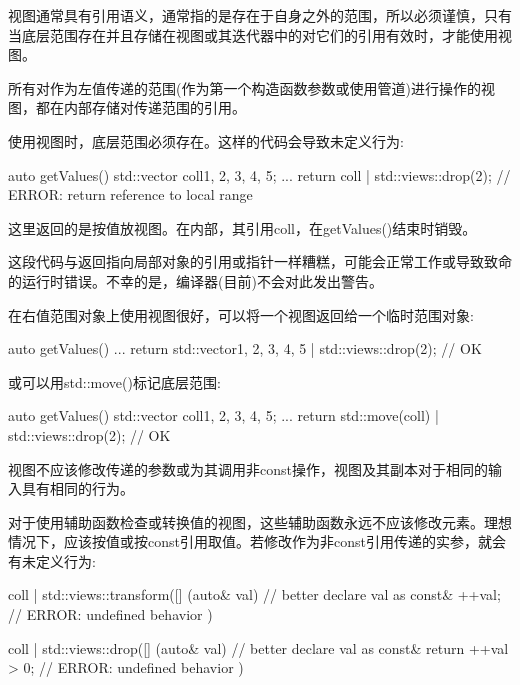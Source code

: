 
视图通常具有引用语义，通常指的是存在于自身之外的范围，所以必须谨慎，只有当底层范围存在并且存储在视图或其迭代器中的对它们的引用有效时，才能使用视图。


所有对作为左值传递的范围(作为第一个构造函数参数或使用管道)进行操作的视图，都在内部存储对传递范围的引用。

使用视图时，底层范围必须存在。这样的代码会导致未定义行为:

\begin{cpp}
auto getValues()
{
	std::vector coll{1, 2, 3, 4, 5};
	...
	return coll | std::views::drop(2); // ERROR: return reference to local range
}
\end{cpp}

这里返回的是按值放视图。在内部，其引用coll，在getValues()结束时销毁。

这段代码与返回指向局部对象的引用或指针一样糟糕，可能会正常工作或导致致命的运行时错误。不幸的是，编译器(目前)不会对此发出警告。

在右值范围对象上使用视图很好，可以将一个视图返回给一个临时范围对象:

\begin{cpp}
auto getValues()
{
	...
	return std::vector{1, 2, 3, 4, 5} | std::views::drop(2); // OK
}
\end{cpp}

或可以用std::move()标记底层范围:

\begin{cpp}
auto getValues()
{
	std::vector coll{1, 2, 3, 4, 5};
	...
	return std::move(coll) | std::views::drop(2); // OK
}
\end{cpp}


视图不应该修改传递的参数或为其调用非const操作，视图及其副本对于相同的输入具有相同的行为。

对于使用辅助函数检查或转换值的视图，这些辅助函数永远不应该修改元素。理想情况下，应该按值或按const引用取值。若修改作为非const引用传递的实参，就会有未定义行为:

\begin{cpp}
coll | std::views::transform([] (auto& val) { // better declare val as const&
	++val; // ERROR: undefined behavior
})

coll | std::views::drop([] (auto& val) { // better declare val as const&
	return ++val > 0; // ERROR: undefined behavior
})
\end{cpp}

